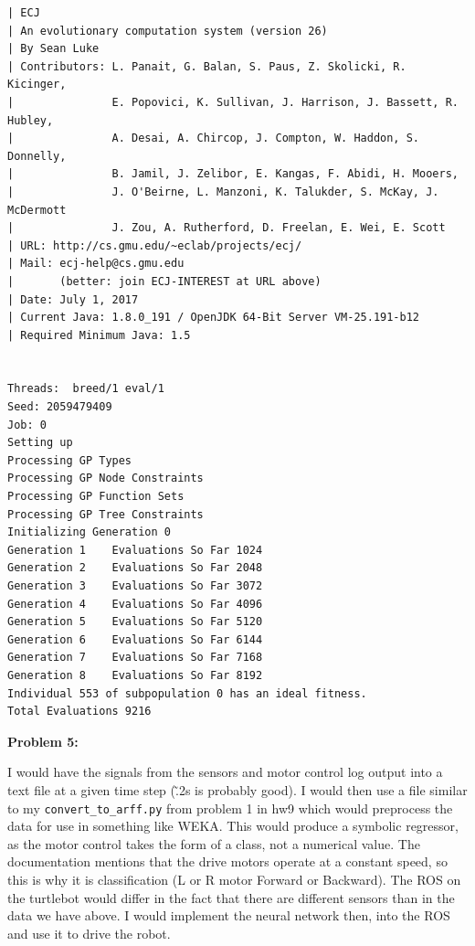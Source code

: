 \documentclass{amsart}
\theoremstyle{definition}
\begin{document}
\begin{verbatim}
| ECJ
| An evolutionary computation system (version 26)
| By Sean Luke
| Contributors: L. Panait, G. Balan, S. Paus, Z. Skolicki, R. Kicinger,
|               E. Popovici, K. Sullivan, J. Harrison, J. Bassett, R. Hubley,
|               A. Desai, A. Chircop, J. Compton, W. Haddon, S. Donnelly,
|               B. Jamil, J. Zelibor, E. Kangas, F. Abidi, H. Mooers,
|               J. O'Beirne, L. Manzoni, K. Talukder, S. McKay, J. McDermott
|               J. Zou, A. Rutherford, D. Freelan, E. Wei, E. Scott
| URL: http://cs.gmu.edu/~eclab/projects/ecj/
| Mail: ecj-help@cs.gmu.edu
|       (better: join ECJ-INTEREST at URL above)
| Date: July 1, 2017
| Current Java: 1.8.0_191 / OpenJDK 64-Bit Server VM-25.191-b12
| Required Minimum Java: 1.5


Threads:  breed/1 eval/1
Seed: 2059479409 
Job: 0
Setting up
Processing GP Types
Processing GP Node Constraints
Processing GP Function Sets
Processing GP Tree Constraints
Initializing Generation 0
Generation 1	Evaluations So Far 1024
Generation 2	Evaluations So Far 2048
Generation 3	Evaluations So Far 3072
Generation 4	Evaluations So Far 4096
Generation 5	Evaluations So Far 5120
Generation 6	Evaluations So Far 6144
Generation 7	Evaluations So Far 7168
Generation 8	Evaluations So Far 8192
Individual 553 of subpopulation 0 has an ideal fitness.
Total Evaluations 9216
\end{verbatim}


\bigbreak
\textbf{Problem 5:}
\bigbreak


I would have the signals from the sensors and motor control log output into a text file at a given time step (\~ .2s is probably good).
I would then use a file similar to my {\tt convert\_to\_arff.py} from problem 1 in hw9 which would preprocess the data for use in something like WEKA.
This would produce a symbolic regressor, as the motor control takes the form of a class, not a numerical value.
The documentation mentions that the drive motors operate at a constant speed, so this is why it is classification (L or R motor Forward or Backward).
The ROS on the turtlebot would differ in the fact that there are different sensors than in the data we have above.
I would implement the neural network then, into the ROS and use it to drive the robot.


\end{document}
